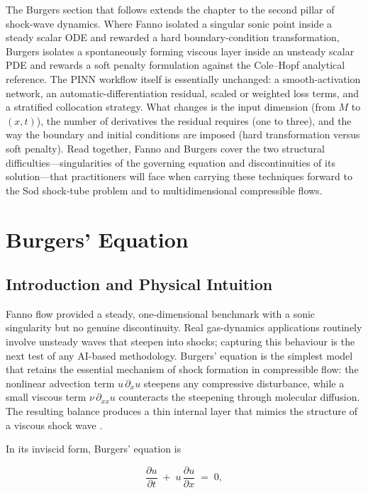 \documentclass[11pt,a4paper]{report}
\begin{document}
The Burgers section that follows extends the chapter to the second pillar of shock-wave dynamics. Where Fanno isolated a singular sonic point inside a steady scalar ODE and rewarded a hard boundary-condition transformation, Burgers isolates a spontaneously forming viscous layer inside an unsteady scalar PDE and rewards a soft penalty formulation against the Cole--Hopf analytical reference. The PINN workflow itself is essentially unchanged: a smooth-activation network, an automatic-differentiation residual, scaled or weighted loss terms, and a stratified collocation strategy. What changes is the input dimension (from $M$ to $(x,t)$), the number of derivatives the residual requires (one to three), and the way the boundary and initial conditions are imposed (hard transformation versus soft penalty). Read together, Fanno and Burgers cover the two structural difficulties---singularities of the governing equation and discontinuities of its solution---that practitioners will face when carrying these techniques forward to the Sod shock-tube problem and to multidimensional compressible flows.

\section{Burgers' Equation}

\subsection{Introduction and Physical Intuition}

Fanno flow provided a steady, one-dimensional benchmark with a sonic singularity but no genuine discontinuity. Real gas-dynamics applications routinely involve unsteady waves that steepen into shocks; capturing this behaviour is the next test of any AI-based methodology. Burgers' equation \cite{Burgers1948} is the simplest model that retains the essential mechanism of shock formation in compressible flow: the nonlinear advection term $u\,\partial_x u$ steepens any compressive disturbance, while a small viscous term $\nu\,\partial_{xx} u$ counteracts the steepening through molecular diffusion. The resulting balance produces a thin internal layer that mimics the structure of a viscous shock wave \cite{Whitham1974}.

In its inviscid form, Burgers' equation is

\begin{equation}
\label{eq:burgers_inviscid}
\frac{\partial u}{\partial t} \;+\; u\,\frac{\partial u}{\partial x} \;=\; 0,
\end{equation}
\end{document}
